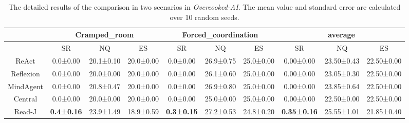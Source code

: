 \documentclass[11pt]{article}
\theoremstyle{plain}
\theoremstyle{remark}
\begin{document}
\begin{table}[h]
\caption{The detailed results of the comparison in two scenarios in \emph{Overcooked-AI}. The mean value and standard error are calculated over 10 random seeds.} 
\vspace{-1em}
\begin{center}
\begin{small}
\begin{sc}
\scriptsize
\begin{adjustbox}{width=1\textwidth}
\begin{tabular}{@{}c|ccc|ccc|ccc@{}}
\hline
\multicolumn{1}{l}{}           & \multicolumn{3}{c}{Cramped\_room}                     & \multicolumn{3}{c}{Forced\_coordination}              & \multicolumn{3}{c}{average}      \\ \hline
\multicolumn{1}{c|}{}          & SR      & NQ       & \multicolumn{1}{c|}{ES}      & SR      & NQ       & \multicolumn{1}{c|}{ES}      & SR      & NQ       & ES      \\ \hline
\multicolumn{1}{c|}{ReAct}     & 0.0±0.00 & 20.1±0.10 & \multicolumn{1}{c|}{20.0±0.00} & 0.0±0.00 & 26.9±0.75 & \multicolumn{1}{c|}{25.0±0.00} & 0.00±0.00 & 23.50±0.43 & 22.50±0.00 \\
\multicolumn{1}{c|}{Reflexion} & 0.0±0.00 & 20.0±0.00 & \multicolumn{1}{c|}{20.0±0.00} & 0.0±0.00 & 26.1±0.60 & \multicolumn{1}{c|}{25.0±0.00} & 0.00±0.00 & 23.05±0.30 & 22.50±0.00 \\
\multicolumn{1}{c|}{MindAgent} & 0.0±0.00 & 20.8±0.47 & \multicolumn{1}{c|}{20.0±0.00} & 0.0±0.00 & 26.9±0.80 & \multicolumn{1}{c|}{25.0±0.00} & 0.00±0.00 & 23.85±0.64 & 22.50±0.00 \\
\multicolumn{1}{c|}{Central}   & 0.0±0.00 & 20.0±0.00 & \multicolumn{1}{c|}{20.0±0.00} & 0.0±0.00 & 25.0±0.00 & \multicolumn{1}{c|}{25.0±0.00} & 0.00±0.00 & 22.50±0.00 & 22.50±0.00 \\
\multicolumn{1}{c|}{Read-J}    & \textbf{0.4±0.16} & 23.9±1.49 & \multicolumn{1}{c|}{18.9±0.59} & \textbf{0.3±0.15} & 27.2±0.53 & \multicolumn{1}{c|}{24.8±0.20} & \textbf{0.35±0.16} & 25.55±1.01 & 21.85±0.40 \\ \hline

\end{tabular}
\end{adjustbox}
\label{main-result-table-2}
\end{sc}
\end{small}
\end{center}
\end{table}
\end{document}
